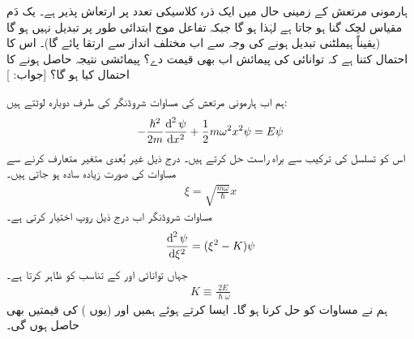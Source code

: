 ہارمونی مرتعش کے زمینی حال میں ایک ذرہ کلاسیکی تعدد   پر ارتعاش پذیر ہے۔ یک دَم مقیاس لچک  گنا ہو جاتا ہے لہٰذا  ہو گا جبکہ  تفاعل موج  ابتدائی طور پر  تبدیل نہیں ہو گا (یقیناً ہیملٹنی تبدیل ہونے کی وجہ سے   اب مختلف انداز سے ارتقا پائے گا)۔ اس کا احتمال کتنا ہے کہ توانائی کی پیمائش اب بھی  قیمت دے؟ پیمائشی نتیجہ  حاصل ہونے کا احتمال کیا ہو گا؟ [جواب: ]

ہم اب ہارمونی مرتعش کی مساوات شروڈنگر کی طرف  دوبارہ لوٹتے ہیں:
\begin{align}\label{مساوات_شروڈنگر_تحلیلی_حل_الف}
-\frac{\hslash^{2}}{2m}\frac{\dif^{\,2}\psi}{\dif x^{2}}+\frac{1}{2}m\omega^{2}x^{2}\psi=E\psi
\end{align}
 اس کو تسلسل کی ترکیب سے  براہ راست  حل کرتے ہیں۔ درج ذیل غیر بُعدی متغیر متعارف کرنے سے  مساوات کی صورت زیادہ   سادہ ہو جاتی  ہیں۔
\begin{align}
\xi=\sqrt{\frac{m\omega}{\hslash}}x
\end{align}
مساوات شروڈنگر اب درج ذیل روپ اختیار کرتی ہے۔
\begin{align}\label{مساوات_شروڈنگر_تحلیلی_شروڈنگر}
\frac{\dif^{\,2}\psi}{\dif \xi^{2}}=(\xi^{2}-K)\psi
\end{align}
جہاں   توانائی     اور    کے تناسب کو ظاہر کرتا ہے۔
\begin{align}\label{مساوات_شروڈنگر_تحلیلی_مستقل}
K\equiv \frac{2E}{\hslash\omega}
\end{align}
ہم نے مساوات  کو حل کرنا ہو گا۔ ایسا کرتے ہوئے ہمیں  اور (یوں )  کی  قیمتیں بھی حاصل ہوں گی۔ 

